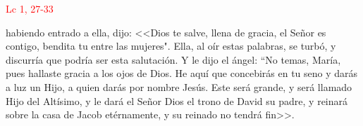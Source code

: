 \hfill\textcolor{red}{Lc 1, 27-33}

habiendo entrado a ella, dijo: <<Dios te salve, llena de gracia, el Señor es contigo, bendita tu entre las mujeres". Ella, al oír estas palabras, se turbó,
y discurría que podría ser esta salutación. Y le dijo el ángel: ``No temas, María, pues hallaste gracia a los ojos de Dios. He aquí que concebirás en tu seno y darás a luz un Hijo,
a quien darás por nombre Jesús. Este será grande, y será llamado Hijo del Altísimo, y le dará el Señor Dios el trono de David su padre, y reinará sobre la casa de Jacob etérnamente, 
y su reinado no tendrá fin>>.
